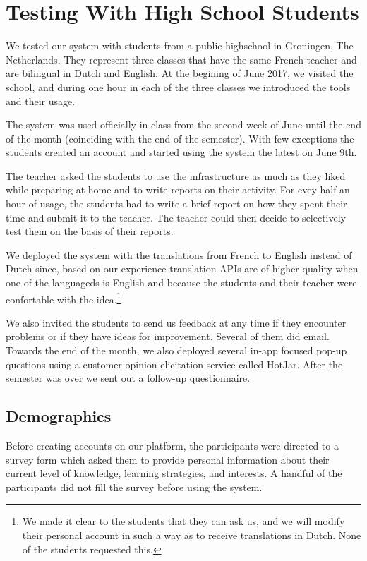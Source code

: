 
\newpage
\section{Testing With High School Students}
\label{sec:demographics}

We tested our system with \stcnt students from a public highschool in Groningen, The Netherlands. They represent three classes that have the same French teacher and are bilingual in Dutch and English. At the begining of June 2017, we visited the school, and during one hour in each of the three classes we introduced the tools and their usage.

The system was used officially in class from the second week of June until the end of the month (coinciding with the end of the semester). With few exceptions the students created an account and started using the system the latest on June 9th. 

The teacher asked the students to use the infrastructure as much as they liked while preparing at home and to write reports on their activity. For evey half an hour of usage, the students had to write a brief report on how they spent their time and submit it to the teacher. The teacher could then decide to selectively test them on the basis of their reports.

We deployed the system with the translations from French to English instead of Dutch since, based on our experience translation APIs are of higher quality when one of the languageds is English and because the students and their teacher were confortable with the idea.\footnote{We made it clear to the students that they can ask us, and we will modify their personal account in such a way as to receive translations in Dutch. None of the students requested this.}

We also invited the students to send us feedback at any time if they encounter problems or if they have ideas for improvement. Several of them did email. Towards the end of the month, we also deployed several in-app focused pop-up questions using a customer opinion elicitation service called HotJar. After the semester was over we sent out a follow-up questionnaire.

\subsection{Demographics}

Before creating accounts on our platform, the participants were directed to a survey form which asked them to provide personal information about their current level of knowledge, learning strategies, and interests. A handful of the participants did not fill the survey before using the system.

